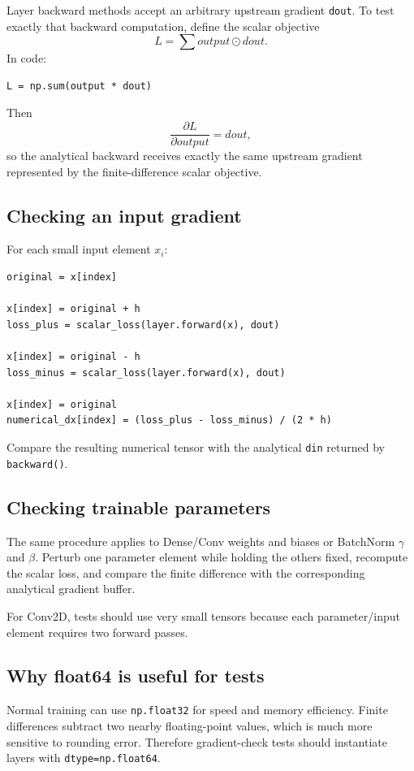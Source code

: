 \documentclass[11pt,a4paper]{article}
\newcommand{\pd}[2]{\frac{\partial #1}{\partial #2}}
\newcommand{\code}[1]{\texttt{#1}}
\newcommand{\had}{\odot}
\begin{document}
Layer backward methods accept an arbitrary upstream gradient \code{dout}. To test exactly that backward computation, define the scalar objective
\[
\boxed{
L=\sum output\had dout
}.
\]
In code:
\begin{lstlisting}
L = np.sum(output * dout)
\end{lstlisting}
Then
\[
\pd{L}{output}=dout,
\]
so the analytical backward receives exactly the same upstream gradient represented by the finite-difference scalar objective.

\subsection{Checking an input gradient}

For each small input element $x_i$:
\begin{lstlisting}
original = x[index]

x[index] = original + h
loss_plus = scalar_loss(layer.forward(x), dout)

x[index] = original - h
loss_minus = scalar_loss(layer.forward(x), dout)

x[index] = original
numerical_dx[index] = (loss_plus - loss_minus) / (2 * h)
\end{lstlisting}
Compare the resulting numerical tensor with the analytical \code{din} returned by \code{backward()}.

\subsection{Checking trainable parameters}

The same procedure applies to Dense/Conv weights and biases or BatchNorm $\gamma$ and $\beta$. Perturb one parameter element while holding the others fixed, recompute the scalar loss, and compare the finite difference with the corresponding analytical gradient buffer.

For Conv2D, tests should use very small tensors because each parameter/input element requires two forward passes.

\subsection{Why float64 is useful for tests}

Normal training can use \code{np.float32} for speed and memory efficiency. Finite differences subtract two nearby floating-point values, which is much more sensitive to rounding error. Therefore gradient-check tests should instantiate layers with \code{dtype=np.float64}.
\end{document}
